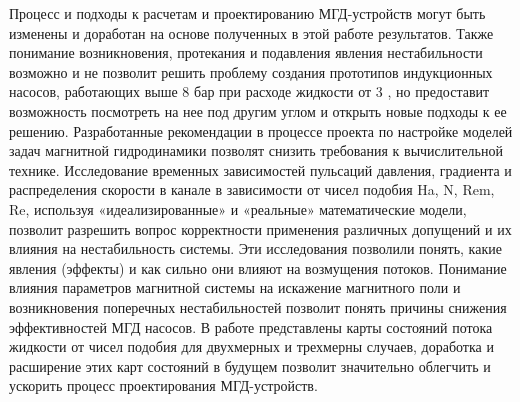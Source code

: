 {\influence} Процесс и подходы к расчетам и проектированию МГД-устройств могут быть изменены и доработан на основе полученных в этой работе результатов. Также понимание возникновения, протекания и подавления явления нестабильности возможно и не позволит решить проблему создания прототипов индукционных насосов, работающих выше 8 $бар$ при расходе жидкости от 3 , но предоставит возможность посмотреть на нее под другим углом и открыть новые подходы к ее решению. Разработанные рекомендации в процессе проекта по настройке моделей задач магнитной гидродинамики позволят снизить требования к вычислительной технике. Исследование временных зависимостей пульсаций давления, градиента и распределения скорости в канале в зависимости от чисел подобия Ha, N, Rem, Re, используя «идеализированные» и «реальные» математические модели, позволит разрешить вопрос корректности применения различных допущений и их влияния на нестабильность системы. Эти исследования позволили понять, какие явления (эффекты) и как сильно они влияют на возмущения потоков. Понимание влияния параметров магнитной системы на искажение магнитного поли и возникновения поперечных нестабильностей позволит понять причины снижения эффективностей МГД насосов. В работе представлены карты состояний потока жидкости от чисел подобия для двухмерных и трехмерны случаев, доработка и расширение этих карт состояний в будущем позволит значительно облегчить и ускорить процесс проектирования МГД-устройств. 


